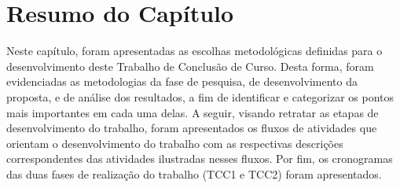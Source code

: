 \section{Resumo do Capítulo}
\label{sec:resumo_metodologia}
Neste capítulo, foram apresentadas as escolhas metodológicas definidas para o desenvolvimento deste Trabalho de Conclusão de Curso. Desta forma, foram evidenciadas as metodologias da fase de pesquisa, de desenvolvimento da proposta, e de análise dos resultados, a fim de identificar e categorizar os pontos mais importantes em cada uma delas. A seguir, visando retratar as etapas de desenvolvimento do trabalho, foram apresentados os fluxos de atividades que orientam o desenvolvimento do trabalho com as respectivas descrições correspondentes das atividades ilustradas nesses fluxos. Por fim, os cronogramas das duas fases de realização do trabalho (TCC1 e TCC2) foram apresentados.